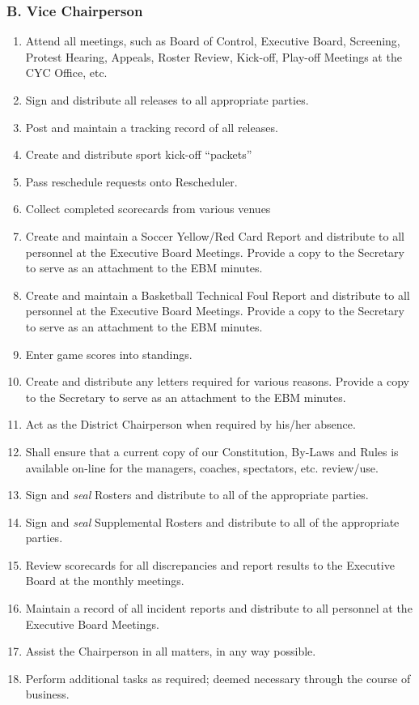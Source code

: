 \subsubsection{B. Vice Chairperson}
\label{ssec:rules-g-3b}
\begin{enumerate}[1.]
    \item Attend all meetings, such as Board of Control, Executive Board, Screening, Protest Hearing, Appeals, Roster Review, Kick-off, Play-off Meetings at the CYC Office, etc.
    \item Sign and distribute all releases to all appropriate parties.
    \item Post and maintain a tracking record of all releases.
    \item Create and distribute sport kick-off “packets”
    \item Pass reschedule requests onto Rescheduler.
    \item Collect completed scorecards from various venues
    \item Create and maintain a Soccer Yellow/Red Card Report and distribute to all personnel at the Executive Board Meetings. Provide a copy to the Secretary to serve as an attachment to the EBM minutes.
    \item Create and maintain a Basketball Technical Foul Report and distribute to all personnel at the Executive Board Meetings. Provide a copy to the Secretary to serve as an attachment to the EBM minutes.
    \item Enter game scores into standings.
    \item Create and distribute any letters required for various reasons.  Provide a copy to the Secretary to serve as an attachment to the EBM minutes.
    \item Act as the District Chairperson when required by his/her absence.
    \item Shall ensure that a current copy of our Constitution, By-Laws and Rules is available on-line for the managers, coaches, spectators, etc. review/use. 
    \item Sign and {\em seal} Rosters and distribute to all of the appropriate parties.
    \item Sign and {\em seal} Supplemental Rosters and distribute to all of the appropriate parties.
    \item Review scorecards for all discrepancies and report results to the Executive Board at the monthly meetings.
    \item Maintain a record of all incident reports and distribute to all personnel at the Executive Board Meetings.
    \item Assist the Chairperson in all matters, in any way possible.
    \item Perform additional tasks as required; deemed necessary through the course of business.
\end{enumerate}

